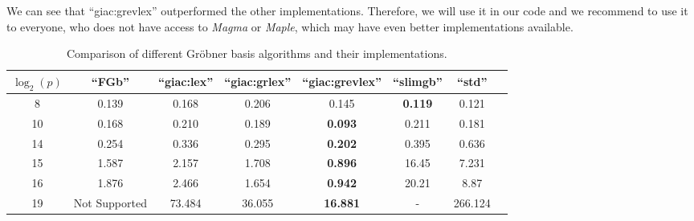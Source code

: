 \documentclass[thesis=M,english]{FITthesis}[2012/10/20]
\theoremstyle{remark}
\theoremstyle{definition}
\begin{document}
\noindent We can see that \enquote{giac:grevlex} outperformed the other implementations. Therefore, we will use it in our code and we recommend to use it to everyone, who does not have access to \textit{Magma} or \textit{Maple}, which may have even better implementations available. 
\begin{table}[H]
\centering
\begin{tabular}{ |c||c|c|c|c|c|c|c| } 
 \hline
$\log_2(p)$ & \enquote{FGb} & \enquote{giac:lex} & \enquote{giac:grlex} & \enquote{giac:grevlex} & \enquote{slimgb} & \enquote{std} \\ 
 \hline
 \hline
 8 & 0.139 & 0.168 &  0.206 & 0.145 & \textbf{0.119} & 0.121 \\ \hline
10 & 0.168 & 0.210 & 0.189 & \textbf{0.093} & 0.211 & 0.181\\ \hline 
14 & 0.254 & 0.336 & 0.295 & \textbf{0.202} & 0.395 &  0.636 \\ \hline
15 & 1.587 & 2.157 & 1.708 & \textbf{0.896} & 16.45 & 7.231 \\ \hline
16 & 1.876 & 2.466 & 1.654 & \textbf{0.942} & 20.21&  8.87 \\ \hline
19 &  Not Supported & 73.484 & 36.055 & \textbf{16.881} & - & 266.124  \\ \hline
\end{tabular}
\caption[Comparison of different Gröbner basis algorithms]{Comparison of different Gröbner basis algorithms and their implementations.}
\label{gbComp}
\end{table}
\end{document}
